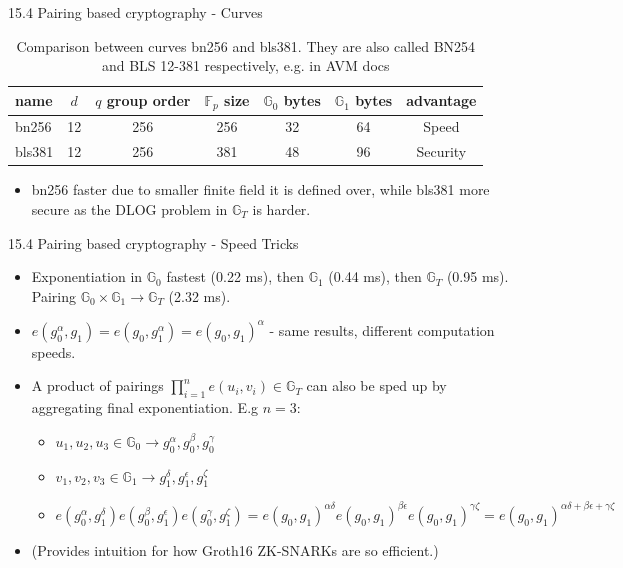 \documentclass[aspectratio=169,xcolor=dvipsnames]{beamer}
\newcommand{\Go}{\mathbb{G}_0}
\newcommand{\Gi}{\mathbb{G}_1}
\newcommand{\Gt}{\mathbb{G}_T}
\begin{document}
\begin{frame}{15.4 Pairing based cryptography - Curves}
      \begin{table}
        \begin{tabular}{l c c c c c c}
            \toprule
            \textbf{name} & \textbf{$d$} & \textbf{$q$ group order} & \textbf{$\mathbb{F}_p$ size} & \textbf{$\Go$ bytes} & \textbf{$\Gi$ bytes} & \textbf{advantage}  \\
            \midrule
            bn256 & 12 & 256 & 256   & 32    & 64    & Speed     \\
            bls381 & 12 & 256 & 381   & 48    & 96    & Security \\
            \bottomrule
        \end{tabular}
        \caption{Comparison between curves bn256 and bls381. They are also called BN254 and BLS 12-381 respectively, e.g. in AVM docs}
    \end{table}

    \begin{itemize}
        \item bn256 faster due to smaller finite field it is defined over, while bls381 more secure as the DLOG problem in $\Gt$ is harder.
    \end{itemize}
\end{frame}

\begin{frame}{15.4 Pairing based cryptography - Speed Tricks}
    \begin{itemize}
        \item Exponentiation in $\Go$ fastest (0.22 ms), then $\Gi$ (0.44 ms), then $\Gt$ (0.95 ms). Pairing $\Go \times \Gi \rightarrow \Gt$ (2.32 ms). 
        \item $e(g_{0}^\alpha, g_{1}) = e(g_{0}, g_{1}^\alpha) = e(g_{0}, g_{1})^\alpha$ - same results, different computation speeds.
        \item A product of pairings $\prod^{n}_{i=1}e(u_{i}, v_{i}) \in \Gt$ can also be sped up by aggregating final exponentiation. E.g $n=3$:
        \begin{itemize}
            \item $u_1, u_2, u_3 \in \Go \rightarrow g_{0}^\alpha, g_{0}^\beta, g_{0}^\gamma$
            \item $v_1, v_2, v_3 \in \Gi \rightarrow g_{1}^\delta, g_{1}^\epsilon, g_{1}^\zeta$
            \item $e(g_{0}^\alpha, g_{1}^\delta)e(g_{0}^\beta, g_{1}^\epsilon)e(g_{0}^\gamma, g_{1}^\zeta) =e(g_0, g_1)^{\alpha \delta}e(g_0, g_1)^{\beta \epsilon}e(g_0, g_1)^{\gamma \zeta} = e(g_0, g_1)^{\alpha \delta + \beta \epsilon + \gamma \zeta}$
        \end{itemize}
        \item (Provides intuition for how Groth16 ZK-SNARKs are so efficient.)
    \end{itemize}
\end{frame}
\end{document}
